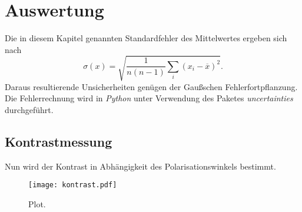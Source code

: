 \chapter{Auswertung}
\label{cha:Auswertung}
Die in diesem Kapitel genannten Standardfehler des Mittelwertes ergeben sich nach
\begin{equation*}
  \label{eqn:MW-Fehler}
  \sigma(x) = \sqrt{\frac{1}{n(n-1)} \sum_i (x_i - \overline{x})^2}.
\end{equation*}
Daraus resultierende Unsicherheiten genügen der Gaußschen Fehlerfortpflanzung.
Die Fehlerrechnung wird in \textit{Python} unter Verwendung des Paketes \textit{uncertainties} \cite{uncertainties} durchgeführt.

\section{Kontrastmessung}
\label{sec:kontrastmessung}
Nun wird der Kontrast in Abhängigkeit des Polarisationswinkels bestimmt. 
\begin{figure}
    \centering
    \texttt{[image: kontrast.pdf]}
    \caption{Plot.}
    \label{fig:plot}
\end{figure}